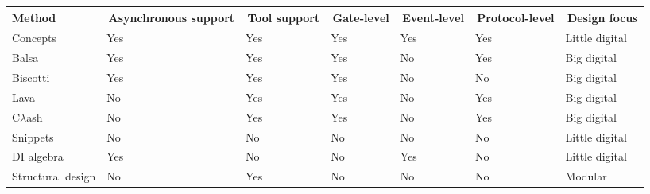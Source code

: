 \documentclass[british, journal]{IEEEtran}
\begin{document}
\begin{table}[h]
	\centering
	\begin{tabular}[htb]{| m{2.6cm} | m{2.0cm} | m{1.3cm} | m{1.5cm} | m{1.5cm} | m{1.7cm} | m{1.9cm} |}
		\hline
		Method             & \,Asynchronous support & \,Tool support  & \,Gate-level & \,Event-level & \,Protocol-level  & \,Design focus \\ \hline \hline
		Concepts            & Yes                               & Yes                       & Yes                       & Yes                         & Yes                              & Little digital \\ \hline
		Balsa             & Yes                               & Yes                        & Yes                       & No                          & Yes                              & Big digital \\ \hline
		Biscotti            & Yes                               & Yes                         & Yes                       & No                          & No                               & Big digital \\ \hline
		Lava              & No                               & Yes                       & Yes                       & No                          & Yes                              & Big digital \\ \hline
		C$\lambda$ash     & No                               & Yes                        & Yes                       & No                          & Yes                              & Big digital \\ \hline
		Snippets          & No                                & No                        & No                        & No                          & No                               & Little digital \\ \hline
		DI algebra        & Yes                               & No                         & No                        & Yes                         & No                               & Little digital \\ \hline
		Structural design & No                                & Yes                        & No                        & No                          & No                               & Modular \\ \hline
	\end{tabular}
	\vspace{-3mm}
\end{table}
\end{document}

